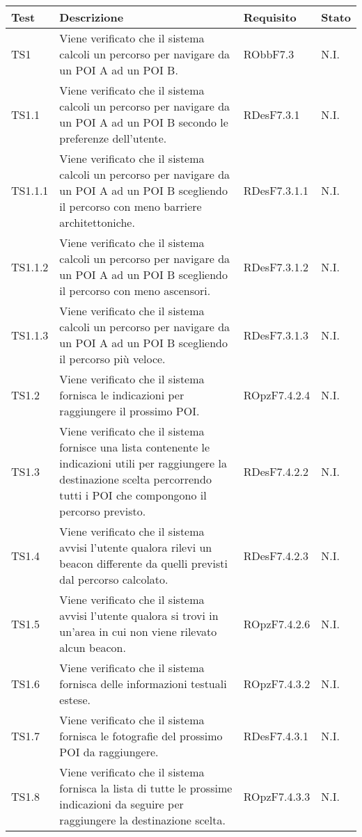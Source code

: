\documentclass[../PianoDiQualifica.tex]{subfiles}
\begin{document}
\begin{appendices}
	\begin{longtabu} to \textwidth {X[0.7] X[2] X[1.3] X}
		\toprule
		\textbf{Test} & \textbf{Descrizione} & \textbf{Requisito} & \textbf{Stato}\\
		\midrule
		\endhead
		TS1 & Viene verificato che il sistema calcoli un percorso per navigare da un POI A ad un POI B. & RObbF7.3 & N.I. \\ 
		\midrule 
		TS1.1 & Viene verificato che il sistema calcoli un percorso per navigare da un POI A ad un POI B secondo le preferenze dell'utente. & RDesF7.3.1 & N.I. \\ 
		\midrule 
		TS1.1.1 & Viene verificato che il sistema calcoli un percorso per navigare da un POI A ad un POI B scegliendo il percorso con meno barriere architettoniche. & RDesF7.3.1.1 & N.I. \\ 
		\midrule 
		TS1.1.2 & Viene verificato che il sistema calcoli un percorso per navigare da un POI A ad un POI B scegliendo il percorso con meno ascensori. & RDesF7.3.1.2 & N.I. \\ 
		\midrule 
		TS1.1.3 & Viene verificato che il sistema calcoli un percorso per navigare da un POI A ad un POI B scegliendo il percorso più veloce. & RDesF7.3.1.3 & N.I. \\ 
		\midrule 
		TS1.2 & Viene verificato che il sistema fornisca le indicazioni per raggiungere il prossimo POI. & ROpzF7.4.2.4 & N.I. \\ 
		\midrule 
		TS1.3 & Viene verificato che il sistema fornisce una lista contenente le indicazioni utili per raggiungere la destinazione scelta percorrendo tutti i POI che compongono il percorso previsto. & RDesF7.4.2.2 & N.I. \\ 
		\midrule 
		TS1.4 & Viene verificato che il sistema avvisi l'utente qualora rilevi un beacon differente da quelli previsti dal percorso calcolato. & RDesF7.4.2.3 & N.I. \\ 
		\midrule 
		TS1.5 & Viene verificato che il sistema avvisi l'utente qualora si trovi in un'area in cui non viene rilevato alcun beacon. & ROpzF7.4.2.6 & N.I. \\ 
		\midrule 
		TS1.6 & Viene verificato che il sistema fornisca delle informazioni testuali estese. & ROpzF7.4.3.2 & N.I. \\ 
		\midrule 
		TS1.7 & Viene verificato che il sistema fornisca le fotografie del prossimo POI da raggiungere. & RDesF7.4.3.1 & N.I. \\ 
		\midrule 
		TS1.8 & Viene verificato che il sistema fornisca la lista di tutte le prossime indicazioni da seguire per raggiungere la destinazione scelta. & ROpzF7.4.3.3 & N.I. \\ 

\end{longtabu}
\end{appendices}
\end{document}
